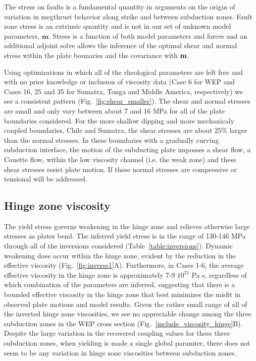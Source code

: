 \documentclass[12pt]{article}
\begin{document}
{The stress on faults is a fundamental quantity in arguments on the origin of variation in megthrust behavior along strike and between subduction zones.
Fault zone stress is an extrinsic quantity and is not in our set of unknown model parameters, $\mathbf{m}$.
Stress is a function of both model parameters and forces and an additional adjoint solve allows the inference of the optimal shear and normal stress within the plate bounaries and the covariance with $\bold{m}$.

Using optimizations in which all of the rheological parameters are left free and with no prior knowledge or inclusion of viscosity data (Case 6 for WEP and Cases 16, 25 and 35 for Sumatra, Tonga and Middle America, respectively)
we see a consistent pattern (Fig.~\ref{fig:shear_smaller}).
The shear and normal stresses are small and only vary between about 7 and 16 MPa for all of the plate boundaries considered.
For the more shallow dipping and more mechanicaly coupled boundaries, Chile and Sumatra, the shear stresses are about 25\% larger than the normal stresses.
In these boundaries with a gradually  curving subduction interface, the motion of the subducting plate imposses a shear flow, a Couette flow, within the low viscosity channel (i.e. the weak zone) and these shear stresses resist plate motion.
If these normal stresses are compressive or tensional will be addressed.


\subsection{Hinge zone viscosity}

The yield stress governs weakening in the hinge zone and relieves otherwise large stresses as plates bend. The inferred yield stress is in the range of 130-146 MPa through all of the inversions considered (Table~\ref{table:inversions}). 
Dynamic weakening does occur within the hinge zone, evident by the reduction in the effective viscosity (Fig.~\ref{fig:inverse1}A). Furthermore, in Cases 1-6, the average effective viscosity in the hinge zone is 
approximately 7-9 $10^{21}$ Pa s, regardless of which combination of the parameters are inferred, suggesting that there is a bounded effective viscosity in the hinge zone that best minimizes the misfit in observed plate motions and model results.
Given the rather small range of all of the inverted hinge zone viscosities, we see no appreciable change among the three subduction zones in the WEP cross section (Fig.~\ref{include_viscosity_hinge}B).
Despite the large variation in the recovered coupling values for
these three subduction zones, when yielding is made a single global paramter, there does not seem to be any variation in hinge zone viscosities between subduction zones.

}
\end{document}

